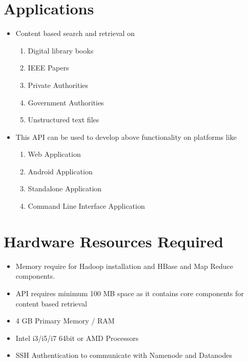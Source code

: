 \documentclass[oneside,a4paper,12pt]{report}
\begin{document}
\section{Applications}
\begin{itemize}
\item Content based search and retrieval on
\begin{enumerate}
\item Digital library books 
\item IEEE Papers
\item Private Authorities
\item Government Authorities
\item Unstructured text files
\end{enumerate}

\item This API can be used to develop above functionality on platforms like
\begin{enumerate}
\item Web Application
\item Android Application
\item Standalone Application
\item Command Line Interface Application
\end{enumerate}

\end{itemize}

\section{Hardware Resources Required}
\begin{itemize}	
\item Memory require for Hadoop installation and HBase and Map Reduce components.
\item API requires minimum 100 MB space as it contains core components for content based retrieval
\item 4 GB Primary Memory / RAM
\item Intel i3/i5/i7 64bit or AMD Processors
\item SSH Authentication to communicate with Namenode and Datanodes
\end{itemize}
\end{document}
